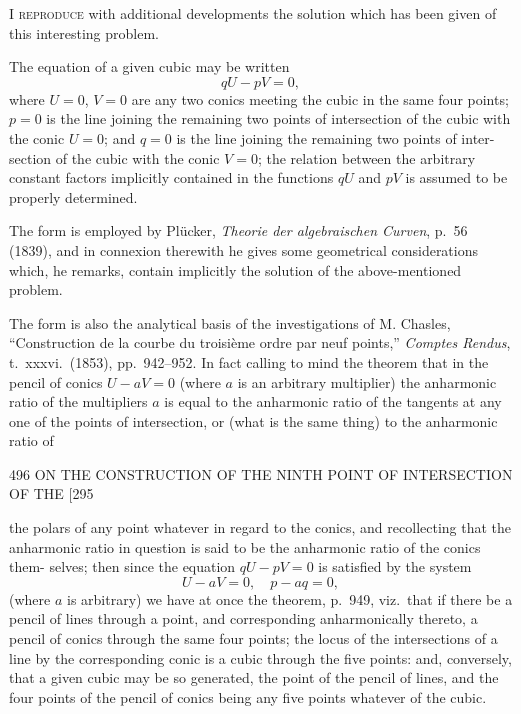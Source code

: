 \documentclass[11pt]{article}
\begin{document}
\medskip

I \textsc{reproduce} with additional developments the solution which has been given of
this interesting problem.

The equation of a given cubic may be written
\[ qU-pV=0, \]
where $U=0$, $V=0$ are any two conics meeting the cubic in the same four points;
$p=0$ is the line joining the remaining two points of intersection of the cubic with
the conic $U=0$; and $q=0$ is the line joining the remaining two points of inter-%
section of the cubic with the conic $V=0$; the relation between the arbitrary constant
factors implicitly contained in the functions $qU$ and $pV$ is assumed to be properly
determined.

The form is employed by Pl\"ucker, \textit{Theorie der algebraischen Curven}, p.~56 (1839),
and in connexion therewith he gives some geometrical considerations which, he remarks,
contain implicitly the solution of the above-mentioned problem.

The form is also the analytical basis of the investigations of M. Chasles,
``Construction de la courbe du troisi\`eme ordre par neuf points,'' \textit{Comptes Rendus},
t.\ xxxvi.\ (1853), pp.\ 942--952. In fact calling to mind the theorem that in the
pencil of conics $U-aV=0$ (where $a$ is an arbitrary multiplier) the anharmonic ratio
of the multipliers $a$ is equal to the anharmonic ratio of the tangents at any one of
the points of intersection, or (what is the same thing) to the anharmonic ratio of

\newpage
\begin{center}
496 \hfill ON THE CONSTRUCTION OF THE NINTH POINT OF INTERSECTION OF THE \hfill \textsc{[295}
\end{center}

the polars of any point whatever in regard to the conics, and recollecting that the
anharmonic ratio in question is said to be the anharmonic ratio of the conics them-%
selves; then since the equation $qU-pV=0$ is satisfied by the system
\[ U-aV=0,\quad p-aq=0, \]
(where $a$ is arbitrary) we have at once the theorem, p.~949, viz.\ that if there be a
pencil of lines through a point, and corresponding anharmonically thereto, a pencil of
conics through the same four points; the locus of the intersections of a line by the
corresponding conic is a cubic through the five points: and, conversely, that a given
cubic may be so generated, the point of the pencil of lines, and the four points of
the pencil of conics being any five points whatever of the cubic.
\end{document}
